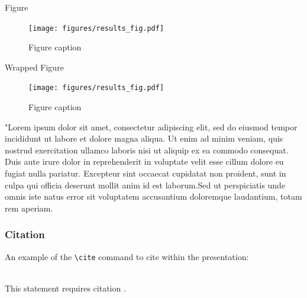 \documentclass[aspectratio=169,xcolor=dvipsnames, t]{beamer}
\begin{document}
\begin{frame}{Figure}
    \begin{figure}
    \texttt{[image: figures/results\_fig.pdf]}
    \caption{Figure caption}
    \end{figure}
\end{frame}

\begin{frame}{Wrapped Figure}
    \begin{figure}
    \centering
    \texttt{[image: figures/results\_fig.pdf]}
    \caption{Figure caption}
\end{figure}
"Lorem ipsum dolor sit amet, consectetur adipiscing elit, sed do eiusmod tempor incididunt ut labore et dolore magna aliqua. Ut enim ad minim veniam, quis nostrud exercitation ullamco laboris nisi ut aliquip ex ea commodo consequat. Duis aute irure dolor in reprehenderit in voluptate velit esse cillum dolore eu fugiat nulla pariatur. Excepteur sint occaecat cupidatat non proident, sunt in culpa qui officia deserunt mollit anim id est laborum.Sed ut perspiciatis unde omnis iste natus error sit voluptatem accusantium doloremque laudantium, totam rem aperiam.
\end{frame}

\begin{frame}[fragile] %
    \frametitle{Citation}
    An example of the \verb|\cite| command to cite within the presentation:\\~

    This statement requires citation \cite{p1}.
\end{frame}
\end{document}
